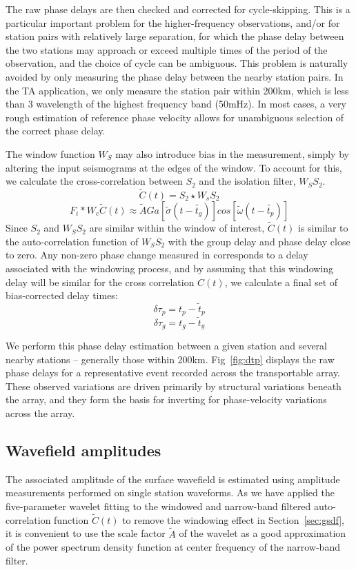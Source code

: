 \documentclass[referee]{gji}
\begin{document}
The raw phase delays are then checked and corrected for cycle-skipping.  This is a particular important problem for the higher-frequency observations, and/or for station pairs with relatively large separation, for which the phase delay between the two stations may approach or exceed multiple times of the period of the observation, and the choice of cycle can be ambiguous. This problem is naturally avoided by only measuring the phase delay between the nearby station pairs. In the TA application, we only measure the station pair within 200km, which is less than 3 wavelength of the highest frequency band (50mHz). In most cases, a very rough estimation of reference phase velocity allows for unambiguous selection of the correct phase delay. 

The window function $W_S$ may also introduce bias in the measurement, simply by altering the input seismograms at the edges of the window.  To account for this, we calculate the cross-correlation between $S_2$ and the isolation filter, $W_SS_2$.
\[
\tilde{C}(t) = S_2 \star W_sS_2
\]
\[
F_i \ast W_c \tilde{C}(t) \approx \tilde{A} Ga [\tilde{\sigma}(t-\tilde{t_g})]cos[\tilde{\omega}(t-\tilde{t_p})]
\]
Since $S_2$ and $W_SS_2$ are similar within the window of interest, $\tilde{C}(t)$ is similar to the auto-correlation function of $W_S S_2$ with the group delay and phase delay close to zero. Any non-zero phase change measured in  corresponds to a delay associated with the windowing process, and by assuming that this windowing delay will be similar for the cross correlation $C(t)$, we calculate a final set of bias-corrected delay times:
\[
\delta \tau_p = t_p - \tilde{t}_p 
\]
\[
\delta \tau_g = t_g - \tilde{t}_g
\]

We perform this phase delay estimation between a given station and several nearby stations – generally those within 200km.  Fig~\ref{fig:dtp} displays the raw phase delays for a representative event recorded across the transportable array. These observed variations are driven primarily by structural variations beneath the array, and they form the basis for inverting for phase-velocity variations across the array.  

\subsection{Wavefield amplitudes}
\label{sec:amp}
The associated amplitude of the surface wavefield is estimated using amplitude measurements performed on single station waveforms. As we have applied the five-parameter wavelet fitting to the windowed and narrow-band filtered auto-correlation function $\tilde{C}(t)$ to remove the windowing effect in Section~\ref{sec:gsdf}, it is convenient to use the scale factor $\tilde{A}$ of the wavelet as a good approximation of the power spectrum density function at center frequency of the narrow-band filter.
\end{document}
